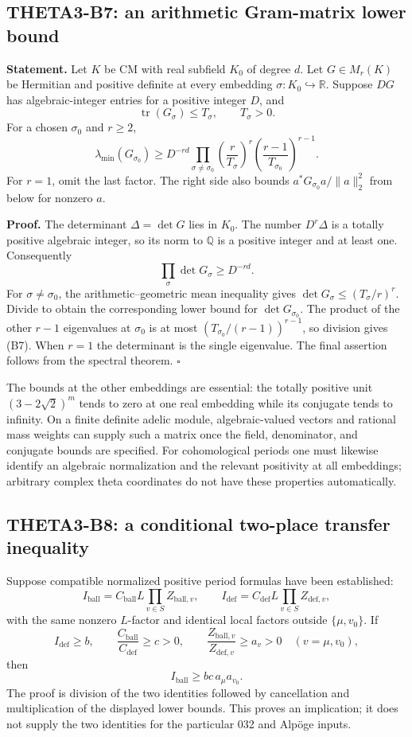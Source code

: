 \documentclass[11pt]{article}
\newcommand{\Q}{\mathbb Q}\newcommand{\C}{\mathbb C}\newcommand{\Z}{\mathbb Z}\newcommand{\R}{\mathbb R}\newcommand{\A}{\mathbb A}\newcommand{\OO}{\mathcal O}
\theoremstyle{definition}\newtheorem{definition}[theorem]{Definition}\newtheorem{remark}[theorem]{Remark}
\begin{document}
\subsection{THETA3-B7: an arithmetic Gram-matrix lower bound}\label{B7}

\textbf{Statement.} Let $K$ be CM with real subfield $K_0$ of degree $d$. Let $G\in M_r(K)$ be Hermitian and positive definite at every embedding $\sigma:K_0\hookrightarrow\R$. Suppose $DG$ has algebraic-integer entries for a positive integer $D$, and
\[
 \operatorname{tr}(G_\sigma)\leq T_\sigma,\qquad T_\sigma>0.
\]
For a chosen $\sigma_0$ and $r\geq2$,
\[
 \lambda_{\min}(G_{\sigma_0})\geq
 D^{-rd}\prod_{\sigma\ne\sigma_0}\left(\frac r{T_\sigma}\right)^r
       \left(\frac{r-1}{T_{\sigma_0}}\right)^{r-1}.
 \tag{B7}
\]
For $r=1$, omit the last factor. The right side also bounds
$a^*G_{\sigma_0}a/\|a\|_2^2$ from below for nonzero $a$.

\textbf{Proof.} The determinant $\Delta=\det G$ lies in $K_0$. The number $D^r\Delta$ is a totally positive algebraic integer, so its norm to $\Q$ is a positive integer and at least one. Consequently
\[
 \prod_\sigma\det G_\sigma\geq D^{-rd}.
\]
For $\sigma\ne\sigma_0$, the arithmetic--geometric mean inequality gives
$\det G_\sigma\leq(T_\sigma/r)^r$. Divide to obtain the corresponding lower bound for $\det G_{\sigma_0}$. The product of the other $r-1$ eigenvalues at $\sigma_0$ is at most $(T_{\sigma_0}/(r-1))^{r-1}$, so division gives (B7). When $r=1$ the determinant is the single eigenvalue. The final assertion follows from the spectral theorem. \hfill$\square$

The bounds at the other embeddings are essential: the totally positive unit $(3-2\sqrt2)^m$ tends to zero at one real embedding while its conjugate tends to infinity. On a finite definite adelic module, algebraic-valued vectors and rational mass weights can supply such a matrix once the field, denominator, and conjugate bounds are specified. For cohomological periods one must likewise identify an algebraic normalization and the relevant positivity at all embeddings; arbitrary complex theta coordinates do not have these properties automatically.

\subsection{THETA3-B8: a conditional two-place transfer inequality}\label{B8}

Suppose compatible normalized positive period formulas have been established:
\[
 I_{\mathrm{ball}}=C_{\mathrm{ball}}L\prod_{v\in S}Z_{\mathrm{ball},v},
 \qquad
 I_{\mathrm{def}}=C_{\mathrm{def}}L\prod_{v\in S}Z_{\mathrm{def},v},
\]
with the same nonzero $L$-factor and identical local factors outside
$\{\mu,v_0\}$. If
\[
 I_{\mathrm{def}}\geq b,\qquad
 \frac{C_{\mathrm{ball}}}{C_{\mathrm{def}}}\geq c>0,
 \qquad \frac{Z_{\mathrm{ball},v}}{Z_{\mathrm{def},v}}\geq a_v>0
 \quad(v=\mu,v_0),
\]
then
\[
 I_{\mathrm{ball}}\geq bc\,a_\mu a_{v_0}.
\]
The proof is division of the two identities followed by cancellation and multiplication of the displayed lower bounds. This proves an implication; it does not supply the two identities for the particular 032 and Alp\"oge inputs.
\end{document}
